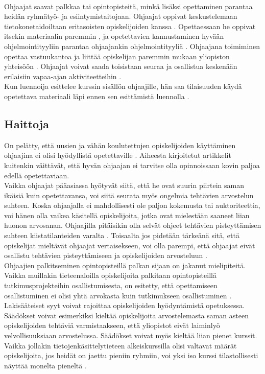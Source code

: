 \documentclass[finnish]{tktltiki2}
\theoremstyle{definition}
\theoremstyle{remark}
\begin{document}
\\
Ohjaajat saavat palkkaa tai opintopisteitä, minkä lisäksi opettaminen parantaa heidän ryhmätyö- ja esiintymistaitojaan. Ohjaajat oppivat keskustelemaan tietokonetaidoiltaan eritasoisten opiskelijoiden kanssa \cite{Vikberg}. Opettaessaan he oppivat itsekin materiaalin paremmin \cite{Reges03}, ja opetettavien kannustaminen hyvään ohjelmointityyliin parantaa ohjaajankin ohjelmointityyliä \cite{Roberts95}. Ohjaajana toimiminen opettaa vastuukantoa ja liittää opiskelijan paremmin mukaan yliopiston yhteisöön \cite{Dickson11}. Ohjaajat voivat saada toisistaan seuraa ja osallistua keskenään erilaisiin vapaa-ajan aktiviteetteihin \cite{Roberts95}.
\\
Kun luennoija esittelee kurssin sisällön ohjaajille, hän saa tilaisuuden käydä opetettava materiaali läpi ennen sen esittämistä luennolla \cite{Kopp00}.


\subsection{Haittoja}
On pelätty, että uusien ja vähän koulutettujen opiskelijoiden käyttäminen ohjaajina ei olisi hyödyllistä opetettaville \cite{Harper02}. Aiheesta kirjoitetut artikkelit kuitenkin väittävät, että hyvän ohjaajan ei tarvitse olla opinnoissaan kovin paljoa edellä opetettaviaan.
\\
Vaikka ohjaajat pääasiassa hyötyvät siitä, että he ovat suurin piirtein saman ikäisiä kuin opetettavansa, voi siitä seurata myös ongelmia tehtävien arvostelun suhteen. Koska ohjaajalla ei mahdollisesti ole paljon kokemusta tai auktoriteettia, voi hänen olla vaikea käsitellä opiskelijoita, jotka ovat mielestään saaneet liian huonon arvosanan. Ohjaajilla pitäisikin olla selvät ohjeet tehtävien pisteyttämisen suhteen kiistatilanteiden varalta \cite{Roberts95}. Toisaalta jos pidetään tärkeänä sitä, että opiskelijat mieltävät ohjaajat vertaisekseen, voi olla parempi, että ohjaajat eivät osallistu tehtävien pisteyttämiseen ja opiskelijoiden arvosteluun \cite{Morgan02}.
\\
Ohjaajien palkitseminen opintopisteillä palkan sijaan on jakanut mielipiteitä. Vaikka muillakin tieteenaloilla opiskelijoita palkitaan opintopisteillä tutkimusprojekteihin osallistumisesta, on esitetty, että opettamiseen osallistuminen ei olisi yhtä arvokasta kuin tutkimukseen osallistuminen \cite{Reges88}.
\\
Lakisääteiset syyt voivat rajoittaa opiskelijoiden hyödyntämistä opetuksessa. Säädökset voivat esimerkiksi kieltää opiskelijoita arvostelemasta saman asteen opiskelijoiden tehtäviä varmistaakseen, että yliopistot eivät laiminlyö velvollisuuksiaan arvostelussa. Säädökset voivat myös kieltää liian pienet kurssit. Vaikka jollakin tietojenkäsittelytieteen alkeiskurssilla olisi valtavat määrät opiskelijoita, jos heidät on jaettu pieniin ryhmiin, voi yksi iso kurssi tilastollisesti näyttää monelta pieneltä \cite{Reges03}.
\end{document}
